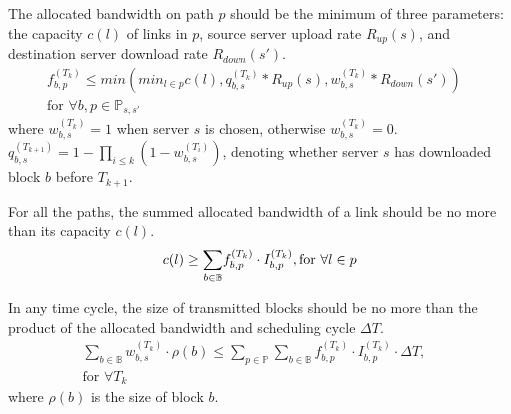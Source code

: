 \begin{packeditemize}

\item The allocated bandwidth on path $p$ should be the minimum of three parameters: the capacity $c(l)$ of links in $p$, source server upload rate $R_{up}(s)$, and destination server download rate $R_{down}(s')$.%
\begin{equation}
\begin{split}
f^{(T_k)}_{b,p} \leq min\left(min_{l\in p} c(l), q_{b,s}^{(T_k)}*R_{up}(s), w_{b,s}^{(T_k)}*R_{down}(s')\right) &\\
\text{for }\forall b, p\in \mathbb{P}_{s,s'} &%
\end{split}
\end{equation}
where $w_{b,s}^{(T_k)}=1$ when server $s$ is chosen, otherwise $w_{b,s}^{(T_k)}=0$. $q_{b,s}^{(T_{k+1})} = 1-\prod_{i\leq k} (1-w_{b,s}^{(T_i)})$, denoting whether server $s$ has downloaded block $b$ before $T_{k+1}$.

\item For all the paths, the summed allocated bandwidth of a link should be no more than its capacity $c(l)$.
\begin{equation}
c(l) \geq \displaystyle{\sum_{b \in \mathbb{B}}} f^{(T_k)}_{b,p} \cdot I^{(T_k)}_{b,p}, \text{for }\forall l\in p\\
\end{equation}

\item In any time cycle, the size of transmitted blocks should be no more than the product of the allocated bandwidth and scheduling cycle $\Delta T$.%
\begin{equation}
\begin{split}
\displaystyle{\sum_{b \in \mathbb{B}}} w_{b,s}^{(T_k)} \cdot \rho(b) \leq \displaystyle{\sum_{p\in \mathbb{P}}} \displaystyle{\sum_{b \in \mathbb{B}}} f^{(T_k)}_{b,p} \cdot I^{(T_k)}_{b,p} \cdot \Delta T,& \\
\text{for }\forall T_k &
\end{split}
\end{equation}
where $\rho(b)$ is the size of block $b$.



\end{packeditemize}
